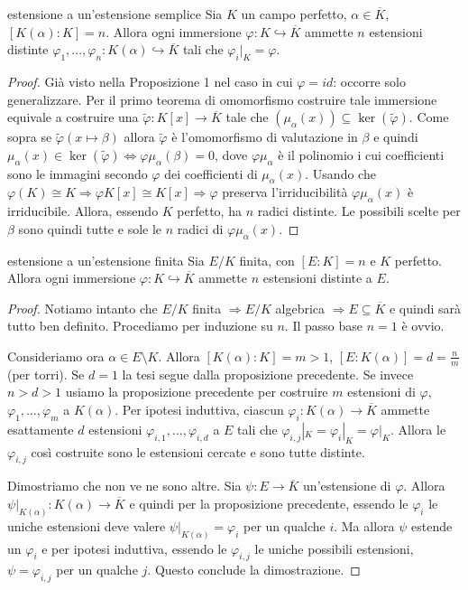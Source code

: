 \begin{proposition}{estensione a un'estensione semplice}
    Sia $K$ un campo perfetto, $\alpha \in \overline{K}$, $[K(\alpha):K] = n$. Allora ogni immersione $\varphi: K \hookrightarrow \overline{K}$ ammette $n$ estensioni distinte $\varphi_1,\dots,\varphi_n: K(\alpha) \hookrightarrow \overline{K}$ tali che $\varphi_i|_K = \varphi$.
\end{proposition}
\begin{proof}
    Già visto nella Proposizione 1 nel caso in cui $\varphi = id$: occorre solo generalizzare.
    Per il primo teorema di omomorfismo costruire tale immersione equivale a costruire una $\tilde \varphi: K[x] \rightarrow \overline{K}$ tale che $(\mu_{\alpha}(x)) \subseteq \ker(\tilde \varphi)$. Come sopra se $\tilde \varphi(x \mapsto \beta)$ allora $\tilde \varphi$ è l'omomorfismo di valutazione in $\beta$ e quindi $\mu_{\alpha}(x) \in \ker(\tilde \varphi) \iff \varphi\mu_{\alpha}(\beta) = 0$, dove $\varphi\mu_{\alpha}$ è il polinomio i cui coefficienti sono le immagini secondo $\varphi$ dei coefficienti di $\mu_{\alpha}(x)$. Usando che $\varphi(K) \cong K \Rightarrow \varphi K[x] \cong K[x] \Rightarrow \varphi$ preserva l'irriducibilità $\varphi\mu_{\alpha}(x)$ è irriducibile. Allora, essendo $K$ perfetto, ha $n$ radici distinte. Le possibili scelte per $\beta$ sono quindi tutte e sole le $n$ radici di $\varphi\mu_{\alpha}(x)$.
\end{proof}
\begin{proposition}{estensione a un'estensione finita}
    Sia $E/K$ finita, con $[E:K] = n$ e $K$ perfetto. Allora ogni immersione $\varphi: K \hookrightarrow \overline{K}$ ammette $n$ estensioni distinte a $E$.
\end{proposition}
\begin{proof}
    Notiamo intanto che $E/K$ finita $\Rightarrow E/K$ algebrica $\Rightarrow E \subseteq \overline{K}$ e quindi sarà tutto ben definito. Procediamo per induzione su $n$. Il passo base $n=1$ è ovvio.

    Consideriamo ora $\alpha \in E \setminus K$. Allora $[K(\alpha) : K] = m > 1$, $[E : K(\alpha)] = d = \frac{n}{m}$ (per torri). Se $d=1$ la tesi segue dalla proposizione precedente. Se invece $n >d>1$ usiamo la proposizione precedente per costruire $m$ estensioni di $\varphi$, $\varphi_1,\dots, \varphi_m$ a $K(\alpha)$. Per ipotesi induttiva, ciascun $\varphi_i:K(\alpha) \rightarrow \overline{K}$ ammette esattamente $d$ estensioni $\varphi_{i,1},\dots,\varphi_{i,d}$ a $E$ tali che $\varphi_{i,j}|_K = \varphi_i|_K = \varphi|_K$. Allora le $\varphi_{i,j}$ così costruite sono le estensioni cercate e sono tutte distinte.
    
    Dimostriamo che non ve ne sono altre. Sia $\psi: E \rightarrow \overline{K}$ un'estensione di $\varphi$. Allora $\psi|_{K(\alpha)}: K(\alpha) \rightarrow \overline{K}$ e quindi per la proposizione precedente, essendo le $\varphi_i$ le uniche estensioni deve valere $\psi|_{K(\alpha)} = \varphi_i$ per un qualche $i$. Ma allora $\psi$ estende un $\varphi_i$ e per ipotesi induttiva, essendo le $\varphi_{i,j}$ le uniche possibili estensioni, $\psi = \varphi_{i,j}$ per un qualche $j$. Questo conclude la dimostrazione. 
\end{proof}
